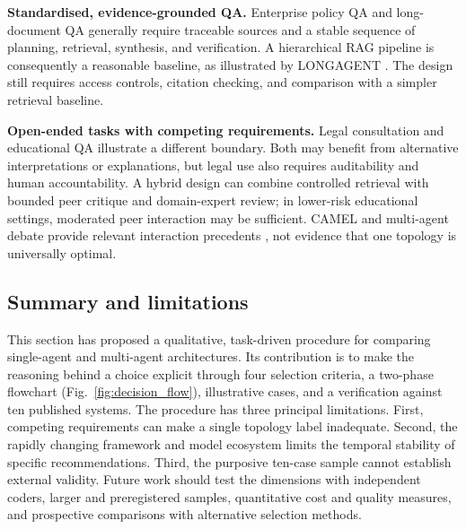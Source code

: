 \documentclass[a4paper,fleqn]{cas-dc}
\begin{document}
\par\noindent\textbf{Standardised, evidence-grounded QA.}
Enterprise policy QA and long-document QA generally require traceable sources
and a stable sequence of planning, retrieval, synthesis, and verification. A
hierarchical RAG pipeline is consequently a reasonable baseline, as illustrated
by LONGAGENT \citep{zhao2024longagent}. The design still requires access
controls, citation checking, and comparison with a simpler retrieval baseline.

\par\noindent\textbf{Open-ended tasks with competing requirements.}
Legal consultation and educational QA illustrate a different boundary. Both
may benefit from alternative interpretations or explanations, but legal use
also requires auditability and human accountability. A hybrid design can
combine controlled retrieval with bounded peer critique and domain-expert
review; in lower-risk educational settings, moderated peer interaction may be
sufficient. CAMEL and multi-agent debate provide relevant interaction
precedents \citep{li2023camel,du2024multiagent_debate}, not evidence that one
topology is universally optimal.

\subsection{Summary and limitations}
\label{sec:limitations}

This section has proposed a qualitative, task-driven procedure for comparing
single-agent and multi-agent architectures. Its contribution is to make the
reasoning behind a choice explicit through four selection criteria, a
two-phase flowchart (Fig.~\ref{fig:decision_flow}), illustrative cases, and a
verification against ten published systems. The procedure has three principal limitations. First,
competing requirements can make a single topology label inadequate. Second,
the rapidly changing framework and model ecosystem limits the temporal
stability of specific recommendations. Third, the purposive ten-case sample
cannot establish external validity. Future work should test the dimensions
with independent coders, larger and preregistered samples, quantitative cost
and quality measures, and prospective comparisons with alternative selection
methods.
\clearpage
\twocolumn
\fi
\end{document}
